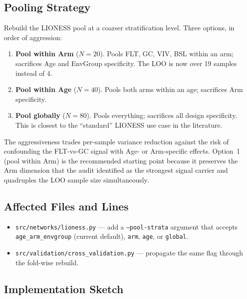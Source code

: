 \documentclass[11pt]{article}
\newcommand{\code}[1]{\texttt{#1}}
\begin{document}
\subsection{Pooling Strategy}

Rebuild the LIONESS pool at a coarser stratification level. Three options, in order of aggression:

\begin{enumerate}[leftmargin=*]
\item \textbf{Pool within Arm} ($N=20$). Pools FLT, GC, VIV, BSL within an arm; sacrifices Age and EnvGroup specificity. The LOO is now over 19 samples instead of 4.
\item \textbf{Pool within Age} ($N=40$). Pools both arms within an age; sacrifices Arm specificity.
\item \textbf{Pool globally} ($N=80$). Pools everything; sacrifices all design specificity. This is closest to the ``standard'' LIONESS use case in the literature.
\end{enumerate}

\noindent The aggressiveness trades per-sample variance reduction against the risk of confounding the FLT-vs-GC signal with Age- or Arm-specific effects. Option~1 (pool within Arm) is the recommended starting point because it preserves the Arm dimension that the audit identified as the strongest signal carrier and quadruples the LOO sample size simultaneously.

\subsection{Affected Files and Lines}

\begin{itemize}[leftmargin=*]
\item \code{src/networks/lioness.py} --- add a \code{--pool-strata} argument that accepts \code{age\_arm\_envgroup} (current default), \code{arm}, \code{age}, or \code{global}.
\item \code{src/validation/cross\_validation.py} --- propagate the same flag through the fold-wise rebuild.
\end{itemize}

\subsection{Implementation Sketch}
\end{document}
